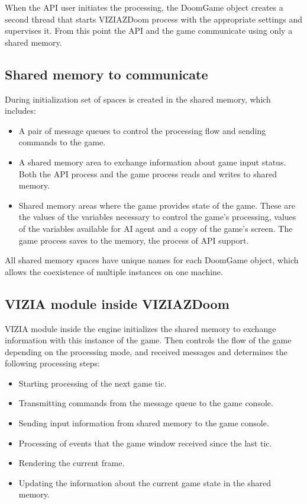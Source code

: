\documentclass[english,bachelor,a4paper,twoside]{ppfcmthesis}
\begin{document}
When the API user initiates the processing, the DoomGame object creates a second thread that starts VIZIAZDoom process with the appropriate settings and supervises it. From this point the API and the game communicate using only a shared memory.


\subsection{Shared memory to communicate}\label{sec:architecture_shared_memory}

During initialization set of spaces is created in the shared memory, which includes:
    \begin{itemize}
    \item A pair of message queues to control the processing flow and sending commands to the game.
    \item A shared memory area to exchange information about game input status. Both the API process and the game process reads and writes to shared memory.
    \item Shared memory areas where the game provides state of the game. These are the values of the variables necessary to control the game's processing, values of the variables available for AI agent and a copy of the game's screen. The game process saves to the memory, the process of API support.
    \end{itemize}
All shared memory spaces have unique names for each DoomGame object, which allows the coexistence of multiple instances on one machine.


\subsection{VIZIA module inside VIZIAZDoom}\label{sec:architecture_inside_viziazdoom}

VIZIA module inside the engine initializes the shared memory to exchange information with this instance of the game. Then controls the flow of the game depending on the processing mode, and received messages and determines the following processing steps:

    \begin{itemize}
    \item Starting processing of the next game tic.
    \item Transmitting commands from the message queue to the game console.
    \item Sending input information from shared memory to the game console.
    \item Processing of events that the game window received since the last tic.
    \item Rendering the current frame.
    \item Updating the information about the current game state in the shared memory.
    \end{itemize}
\end{document}
